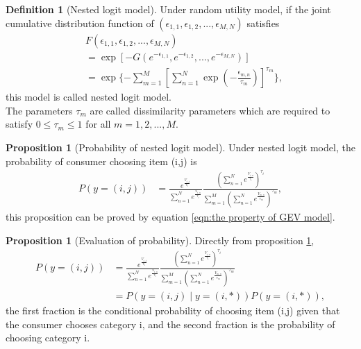 \documentclass[12pt]{article}
\theoremstyle{definition}
\newtheorem{definition}{Definition}[section]
\newtheorem{prop}[theorem]{Proposition}
\begin{document}
\begin{sloppypar}
\begin{definition}[Nested logit model]
    Under random utility model, if the joint cumulative distribution function of $(\epsilon_{1,1}, \epsilon_{1,2}, ..., \epsilon_{M,N})$ satisfies
    \begin{align*}
        &F(\epsilon_{1,1}, \epsilon_{1,2}, ..., \epsilon_{M,N})\\
        &=\exp[-G(e^{-\epsilon_{1,1}}, e^{-\epsilon_{1,2}}, ..., e^{-\epsilon_{M,N}})]\\
        &=\exp\{-\sum_{m=1}^{M}[\sum_{n=1}^{N}\exp(-\frac{\epsilon_{m,n}}{\tau_m})]^{\tau_m}\},
    \end{align*}
    this model is called nested logit model. \\
    The parameters $\tau_m$ are called dissimilarity parameters which are required to satisfy $0 \leq \tau_m \leq 1$ for all $m=1,2,...,M$.
\end{definition}

\begin{prop}[Probability of nested logit model]\label{prop:1}
    Under nested logit model, the probability of consumer choosing item (i,j) is
    \begin{align*}
        P(y=(i,j)) &= \frac{e^\frac{{V_{i,j}}}{\tau_i}}{\sum_{n=1}^{N} e^\frac{{V_{i,n}}}{\tau_i}} \frac{(\sum_{n=1}^{N} e^\frac{{V_{i,n}}}{\tau_i})^{\tau_i}}{\sum_{m=1}^{M}(\sum_{n=1}^{N} e^\frac{{V_{m,n}}}{\tau_m})^{\tau_m}},
    \end{align*}
    this proposition can be proved by equation \ref{eqn:the property of GEV model}.
\end{prop}

\begin{prop}[Evaluation of probability]\label{prop:2}
    Directly from proposition \ref{prop:1}, 
    \begin{align*}
        P(y=(i,j)) 
        &= \frac{e^\frac{{V_{i,j}}}{\tau_i}}{\sum_{n=1}^{N} e^\frac{{V_{i,n}}}{\tau_i}} \frac{(\sum_{n=1}^{N} e^\frac{{V_{i,n}}}{\tau_i})^{\tau_i}}{\sum_{m=1}^{M}(\sum_{n=1}^{N} e^\frac{{V_{m,n}}}{\tau_m})^{\tau_m}}\\
        &= P(y=(i,j) \mid y=(i,*))P(y=(i,*)),
    \end{align*}
    the first fraction is the conditional probability of choosing item (i,j) given that the consumer chooses category i, and the second fraction is the probability of choosing category i.
\end{prop}




\end{sloppypar}
\end{document}
